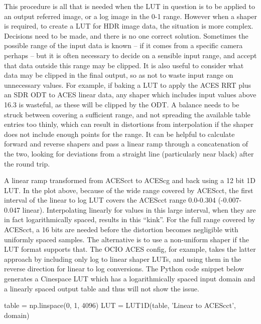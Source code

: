 This procedure is all that is needed when the LUT in question is to be applied to an output referred image, or a log image in the 0-1 range. However when a shaper is required, to create a LUT for HDR image data, the situation is more complex. Decisions need to be made, and there is no one correct solution. Sometimes the possible range of the input data is known – if it comes from a specific camera perhaps – but it is often necessary to decide on a sensible input range, and accept that data outside this range may be clipped. It is also useful to consider what data may be clipped in the final output, so as not to waste input range on unnecessary values. For example, if baking a LUT to apply the ACES RRT plus an SDR ODT to ACES linear data, any shaper which includes input values above 16.3 is wasteful, as these will be clipped by the ODT. A balance needs to be struck between covering a sufficient range, and not spreading the available table entries too thinly, which can result in distortions from interpolation if the shaper does not include enough points for the range. It can be helpful to calculate forward and reverse shapers and pass a linear ramp through a concatenation of the two, looking for deviations from a straight line (particularly near black) after the round trip.

A linear ramp transformed from ACEScct to ACEScg and back using a 12 bit 1D LUT.
In the plot above, because of the wide range covered by ACEScct, the first interval of the linear to log LUT covers the ACEScct range 0.0-0.304 (-0.007-0.047 linear). Interpolating linearly for values in this large interval, when they are in fact logarithmically spaced, results in this “kink”. For the full range covered by ACEScct, a 16 bits are needed before the distortion becomes negligible with uniformly spaced samples. The alternative is to use a non-uniform shaper if the LUT format supports that. The OCIO ACES config, for example, takes the latter approach by including only log to linear shaper LUTs, and using them in the reverse direction for linear to log conversions. The Python code snippet below generates a Cinespace LUT which has a logarithmically spaced input domain and a linearly spaced output table and thus will not show the issue.


table = np.linspace(0, 1, 4096)
LUT = LUT1D(table, 'Linear to ACEScct', domain)

